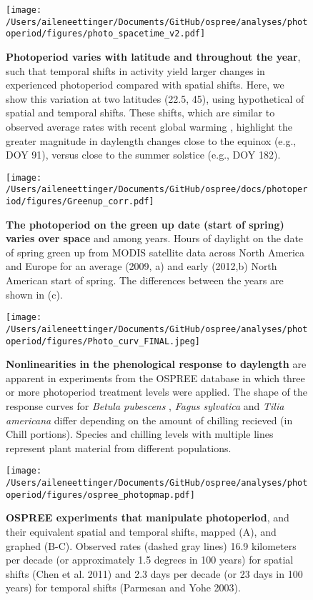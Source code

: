 \documentclass{article}
\begin{document}
\begin{figure}[p]
\centering
\texttt{[image: /Users/aileneettinger/Documents/GitHub/ospree/analyses/photoperiod/figures/photo\_spacetime\_v2.pdf]} %
\caption{\textbf{Photoperiod varies with latitude and throughout the year}, such that temporal shifts in activity yield larger changes in experienced photoperiod compared with spatial shifts. Here, we show this variation at two latitudes (22.5\degree, 45\degree), using hypothetical of spatial and temporal shifts. These shifts, which are similar to observed average rates with recent global warming \citep[e.g.,][]{parmesan2006,chen2011}, highlight the greater magnitude in daylength changes close to the equinox (e.g., DOY 91), versus close to the summer solstice (e.g., DOY 182).}
 \label{fig:spacetime}%
 \end{figure}
 
 \begin{figure}[p]
\centering
\texttt{[image: /Users/aileneettinger/Documents/GitHub/ospree/docs/photoperiod/figures/Greenup\_corr.pdf]} %
\caption{\textbf{The photoperiod on the green up date (start of spring) varies over space} and among years. Hours of daylight on the date of spring green up from MODIS satellite data across North America and Europe for an average (2009, a) and  early (2012,b) North American start of spring. The differences between the years are shown in (c). }
 \label{fig:greenup}%
 \end{figure}
 
\begin{figure}[p]
\texttt{[image: /Users/aileneettinger/Documents/GitHub/ospree/analyses/photoperiod/figures/Photo\_curv\_FINAL.jpeg]} 
\caption{\textbf{Nonlinearities in the phenological response to daylength} are apparent in experiments from the OSPREE database in which three or more photoperiod treatment levels were applied. The shape of the response curves for \textit{Betula pubescens} \citep{Caffarra:2011b}, \textit{Fagus sylvatica} \citep{Heide:1993a} and \textit{Tilia americana} \citep{Ashby:1962aa} differ depending on the amount of chilling recieved (in Chill portions). Species and chilling levels with multiple lines represent plant material from different populations.}
 \label{fig:photocurve}
 \end{figure}


\begin{figure}[p]
\centering
\texttt{[image: /Users/aileneettinger/Documents/GitHub/ospree/analyses/photoperiod/figures/ospree\_photopmap.pdf]} 
\caption{\textbf{OSPREE experiments that manipulate photoperiod}, and their equivalent spatial and temporal shifts, mapped (A), and graphed (B-C). Observed rates (dashed gray lines) 16.9 kilometers per decade (or approximately 1.5 degrees in 100 years) for spatial shifts (Chen et al. 2011) and 2.3 days per decade (or 23 days in 100 years) for temporal shifts (Parmesan and Yohe 2003).}
 \label{fig:photomap}
 \end{figure}
\end{document}

